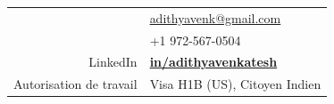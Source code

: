 \documentclass[10pt]{article} %
\begin{document}
\begin{minipage}[t]{0.49\textwidth} %


\vspace{10pt}
\colorbox{shade}{
    \textcolor{text1}{
        \begin{tabular}{r|p{4cm}}
            \raisebox{-1pt}{\Letter} & \href{mailto:adithyavenk@gmail.com}{adithyavenk@gmail.com} \\ %
            \raisebox{-3pt}{\Mobilefone} & +1 972-567-0504 \\ %
            LinkedIn & \href{https://www.linkedin.com/in/adithyavenkatesh}{\textbf{in/adithyavenkatesh}} \\
            Autorisation de travail & Visa H1B (US), Citoyen Indien
        \end{tabular}
    }
}\\[10pt]

\end{minipage}
\end{document}
